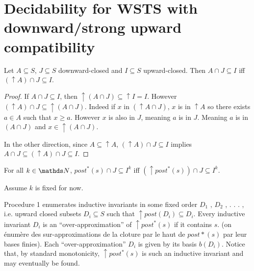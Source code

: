 
\section{Decidability for WSTS with downward/strong upward compatibility}



\begin{lemma}
Let $A \subseteq S$, $J \subseteq S$ downward-closed and $I \subseteq S$ upward-closed. 
Then $A \cap J \subseteq I$  iff $ (\uparrow  A) \cap J \subseteq I$.
\end{lemma}


\begin{proof}

If 
$A \cap J \subseteq I$,
then
${\uparrow (A \cap J)} \subseteq {\uparrow I} = I$.
However
$({\uparrow A}) \cap J \subseteq {\uparrow (A \cap J)}$.
Indeed if $x$ in $({\uparrow A} \cap J)$,
$x$ is in $\uparrow A$
so there exists $a \in A$ such that $x \geq a$.
However $x$ is also in $J$, meaning $a$ is in $J$.
Meaning $a$ is in $(A \cap J)$
and $x \in { \uparrow (A \cap J)}$.

In the other direction,
since $A \subseteq {\uparrow A}$,
$({\uparrow  A}) \cap J \subseteq I$ implies
$A \cap J \subseteq ({\uparrow  A}) \cap J \subseteq I$.
\end{proof}


\begin{corollary}
For all $k \in \N$,
$ post^*(s)\cap J \subseteq I^k $  iff $ (\uparrow  post^*(s)) \cap J \subseteq I^k$. 
\end{corollary}




Assume $k$ is fixed for now.

Procedure 1 enumerates inductive invariants in some fixed order $D_1$ , $D_2$ , . . . , i.e. upward closed subsets $D_i \subseteq S$ such that $\uparrow post(D_i ) \subseteq D_i$. 
Every inductive invariant $D_i$ is an “over-approximation” of $\uparrow post^*(s)$ if it contains $s$.
(on énumère des sur-approximations de la cloture par le haut de $post*(s)$ par leur bases finies).
Each “over-approximation” $D_i$ is given by its basis $b(D_i)$. Notice that, by standard monotonicity, $\uparrow post^*(s)$ is such an inductive invariant and may
eventually be found.

